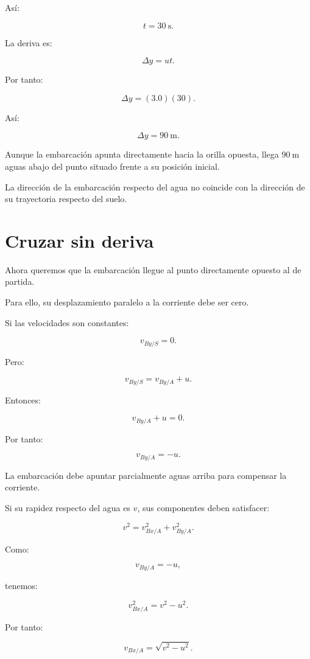 Así:

\[
\boxed{
t=\SI{30}{\second}
}.
\]

La deriva es:

\[
\Delta y=ut.
\]

Por tanto:

\[
\Delta y=(3.0)(30).
\]

Así:

\[
\boxed{
\Delta y=\SI{90}{\meter}
}.
\]

\begin{interpretacion}

Aunque la embarcación apunta directamente
hacia la orilla opuesta, llega
\(\SI{90}{\meter}\) aguas abajo
del punto situado frente a su posición inicial.

La dirección de la embarcación respecto del agua
no coincide con la dirección de su trayectoria
respecto del suelo.

\end{interpretacion}


\section{Cruzar sin deriva}

Ahora queremos que la embarcación llegue al punto
directamente opuesto al de partida.

Para ello, su desplazamiento paralelo a la corriente
debe ser cero.

Si las velocidades son constantes:

\[
v_{By/S}=0.
\]

Pero:

\[
v_{By/S}=v_{By/A}+u.
\]

Entonces:

\[
v_{By/A}+u=0.
\]

Por tanto:

\[
\boxed{
v_{By/A}=-u
}.
\]

La embarcación debe apuntar parcialmente
aguas arriba para compensar la corriente.

Si su rapidez respecto del agua es \(v\),
sus componentes deben satisfacer:

\[
v^2=v_{Bx/A}^2+v_{By/A}^2.
\]

Como:

\[
v_{By/A}=-u,
\]

tenemos:

\[
v_{Bx/A}^2=v^2-u^2.
\]

Por tanto:

\[
\boxed{
v_{Bx/A}=\sqrt{v^2-u^2}
}.
\]

